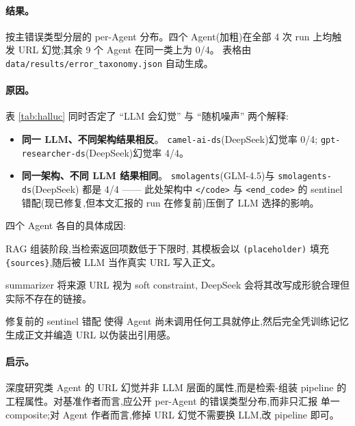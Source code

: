 \documentclass[UTF8,11pt]{ctexart}
\begin{document}
\paragraph{结果。}
\begin{table}[h]
  \centering
  \small
  
  \caption{按主错误类型分层的 per-Agent 分布。四个 Agent(加粗)在全部
    4 次 run 上均触发 URL 幻觉;其余 9 个 Agent 在同一类上为 0/4。
    表格由 \texttt{data/results/error\_taxonomy.json} 自动生成。}
  \label{tab:halluc}
\end{table}

\paragraph{原因。}
表 \ref{tab:halluc} 同时否定了 “LLM 会幻觉” 与 “随机噪声”
两个解释:
\begin{itemize}[leftmargin=2em,itemsep=2pt,labelsep=0.5em]
  \item \textbf{同一 LLM、不同架构结果相反}。
    \texttt{camel-ai-ds}(DeepSeek)幻觉率 0/4;
    \texttt{gpt-researcher-ds}(DeepSeek)幻觉率 4/4。
  \item \textbf{同一架构、不同 LLM 结果相同}。
    \texttt{smolagents}(GLM-4.5)与 \texttt{smolagents-ds}(DeepSeek)
    都是 4/4 —— 此处架构中 \texttt{</code>} 与
    \texttt{<end\_code>} 的 sentinel 错配(现已修复,但本文汇报的 run
    在修复前)压倒了 LLM 选择的影响。
\end{itemize}
四个 Agent 各自的具体成因:
\begin{description}[leftmargin=2em,itemsep=2pt,labelsep=0.5em]
  \item[\texttt{gpt-researcher-ds}] RAG 组装阶段,当检索返回项数低于下限时,
    其模板会以 \texttt{(placeholder)} 填充 \texttt{\{sources\}},随后被
    LLM 当作真实 URL 写入正文。
  \item[\texttt{odr-ds}] summarizer 将来源 URL 视为 soft constraint,
    DeepSeek 会将其改写成形貌合理但实际不存在的链接。
  \item[\texttt{smolagents}(两种 LLM 后端均然)] 修复前的 sentinel 错配
    使得 Agent 尚未调用任何工具就停止,然后完全凭训练记忆生成正文并编造
    URL 以伪装出引用感。
\end{description}

\paragraph{启示。}
深度研究类 Agent 的 URL 幻觉并非 LLM 层面的属性,而是检索-组装 pipeline
的工程属性。对基准作者而言,应公开 per-Agent 的错误类型分布,而非只汇报
单一 composite;对 Agent 作者而言,修掉 URL 幻觉不需要换 LLM,改 pipeline
即可。
\end{document}
